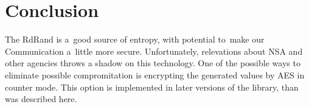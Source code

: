 \chapter{Conclusion}
The RdRand is a~good source of entropy, with potential to~make our Communication
a~little more secure. Unfortunately, relevations about NSA and other agencies 
throws a shadow on this technology. One of the possible ways to eliminate possible
compromitation is encrypting the generated values by AES in counter mode. 
This option is implemented in later versions of the library, than was described here.

